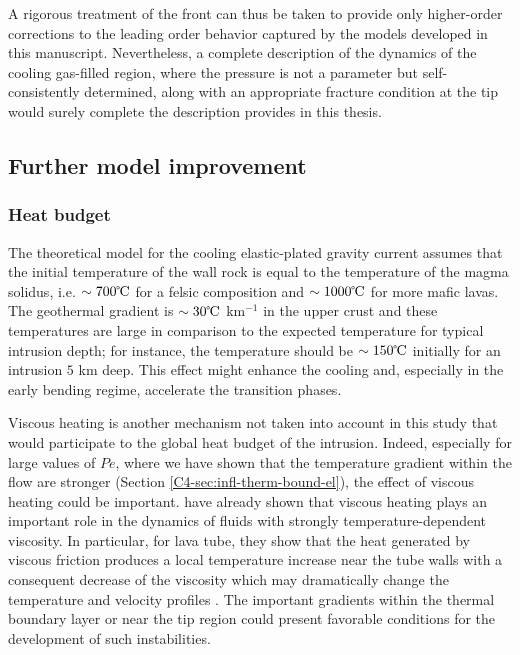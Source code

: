 A rigorous  treatment of the front  can thus be taken  to provide only
higher-order corrections to the leading order behavior captured by the
models  developed   in  this  manuscript.  Nevertheless,   a  complete
description of  the dynamics of  the cooling gas-filled  region, where
the  pressure is  not  a parameter  but self-consistently  determined,
along with an  appropriate fracture condition at the  tip would surely
complete the description provides in this thesis.


\subsection{Further model improvement}
\label{sec:generalization-model}

\subsubsection*{Heat budget}
\label{subsubsection}

The theoretical  model for the cooling  elastic-plated gravity current
assumes that the initial temperature of  the wall rock is equal to the
temperature of  the magma solidus,  i.e. $\sim 700 \celsius$  for a
felsic composition and  $\sim 1000 \celsius$ for  more mafic lavas.
The geothermal gradient  is $\sim 30 \celsius$ km$^{-1}$  in the upper
crust and these  temperatures are large in comparison  to the expected
temperature for typical intrusion depth; for instance, the temperature
should be $\sim 150 \celsius$ initially  for an intrusion $5$ km deep.
This effect  might enhance  the cooling and,  especially in  the early
bending regime, accelerate the transition phases.

Viscous heating is another mechanism not taken into account in this
study  that  would  participate  to  the global  heat  budget  of  the
intrusion. Indeed, especially for large  values of $Pe$, where we have
shown  that the  temperature  gradient within  the  flow are  stronger
(Section  \ref{C4-sec:infl-therm-bound-el}),  the  effect  of  viscous
heating could  be important.  \citet{Costa:2005bq} have  already shown
that viscous heating plays an important role in the dynamics of fluids
with strongly temperature-dependent viscosity. In particular, for lava
tube, they show that the heat generated by viscous friction produces a
local  temperature increase  near  the tube  walls  with a  consequent
decrease  of   the  viscosity   which  may  dramatically   change  the
temperature             and              velocity             profiles
\citep{Costa:2002cj,Costa:2003wk,Costa:2005bq}.      The     important
gradients within  the thermal  boundary layer or  near the  tip region
could  present  favorable  conditions  for  the  development  of  such
instabilities. 

